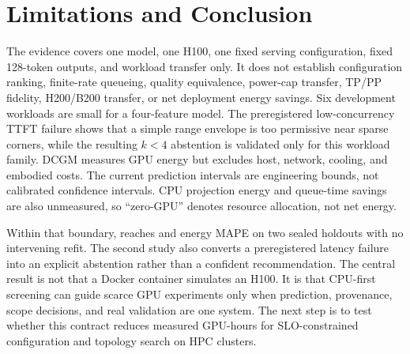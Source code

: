 \section{Limitations and Conclusion}

The evidence covers one model, one H100, one fixed serving configuration,
fixed 128-token outputs, and workload transfer only.  It does not establish
configuration ranking, finite-rate queueing, quality equivalence, power-cap
transfer, TP/PP fidelity, H200/B200 transfer, or net deployment energy savings.
Six development workloads are small for a four-feature model.  The
preregistered low-concurrency TTFT failure shows that a simple range envelope
is too permissive near sparse corners, while the resulting $k<4$ abstention is
validated only for this workload family.  DCGM measures GPU energy but excludes host,
network, cooling, and embodied costs.  The current prediction intervals are
engineering bounds, not calibrated confidence intervals.  CPU projection
energy and queue-time savings are also unmeasured, so ``zero-GPU'' denotes
resource allocation, not net energy.

Within that boundary, \system{} reaches \CalibratedEnergyMAPE{} and
\ConfirmationEnergyMAPE{} energy MAPE on two sealed holdouts with no intervening
refit.  The second study also converts a preregistered latency failure into an
explicit abstention rather than a confident recommendation.  The central
result is not that a Docker container simulates an H100.  It is that CPU-first
screening can guide scarce GPU experiments only when prediction, provenance,
scope decisions, and real validation are one system.  The next step is to test
whether this contract reduces measured GPU-hours for SLO-constrained
configuration and topology search on HPC clusters.

